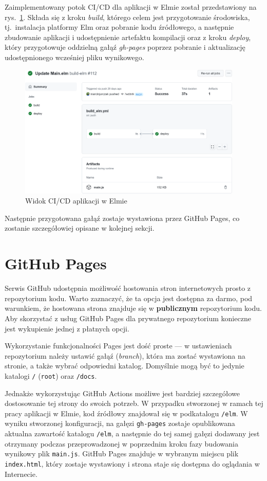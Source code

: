 \documentclass[twoside,a4paper]{report}
\begin{document}
Zaimplementowany potok CI/CD dla aplikacji w Elmie został przedstawiony na rys.~\ref{fig:elm_yml}.
Składa się z kroku \textit{build}, którego celem jest przygotowanie środowiska, tj.~instalacja platformy Elm oraz pobranie kodu źródłowego, a następnie zbudowanie aplikacji i udostępnienie artefaktu kompilacji oraz z kroku \textit{deploy}, który przygotowuje oddzielną gałąź \textit{gh-pages} poprzez pobranie i aktualizację udostępnionego wcześniej pliku wynikowego.
\begin{figure}[H]
    \centering
    \includegraphics[width=0.95\textwidth]{img/elm_yml.png}
    \caption{Widok CI/CD aplikacji w Elmie}\label{fig:elm_yml}
\end{figure}

Następnie przygotowana gałąź zostaje wystawiona przez GitHub Pages, co zostanie szczegółowiej opisane w kolejnej sekcji.

\section{GitHub Pages}
Serwis GitHub udostępnia możliwość hostowania stron internetowych prosto z repozytorium kodu. Warto zaznaczyć, że ta opcja jest dostępna za darmo, pod warunkiem, że hostowana strona znajduje się w \textbf{publicznym} repozytorium kodu. Aby skorzystać z usług GitHub Pages dla prywatnego repozytorium konieczne jest wykupienie jednej z płatnych opcji.

Wykorzystanie funkcjonalności Pages jest dość proste --- w ustawieniach repozytorium należy ustawić gałąź (\textit{branch}), która ma zostać wystawiona na stronie, a także wybrać odpowiedni katalog.
Domyślnie mogą być to jedynie katalogi \texttt{/} (\texttt{root}) oraz \texttt{/docs}.

Jednakże wykorzystując GitHub Actions możliwe jest bardziej szczegółowe dostosowanie tej strony do swoich potrzeb.
W przypadku stworzonej w ramach tej pracy aplikacji w Elmie, kod źródłowy znajdował się w podkatalogu \texttt{/elm}.
W wyniku stworzonej konfiguracji, na gałęzi \texttt{gh-pages} zostaje opublikowana aktualna zawartość katalogu \texttt{/elm}, a następnie do tej samej gałęzi dodawany jest otrzymany podczas przeprowadzonej w poprzednim kroku fazy budowania wynikowy plik \texttt{main.js}.
GitHub Pages znajduje w wybranym miejscu plik \texttt{index.html}, który zostaje wystawiony i strona staje się dostępna do oglądania w Internecie.
\end{document}
